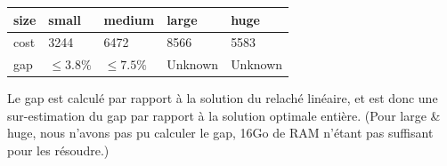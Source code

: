 \documentclass[a4paper,12pt]{article}
\begin{document}
\begin{table}[h]
    \centering

    \begin{tabular}{lllll}
    size & small         & medium       & large   & huge    \\ \hline
    cost & 3244          & 6472         & 8566    & 5583    \\
    gap  & $\leq 3.8 \%$ & $\leq 7.5\%$ & Unknown & Unknown \\ \hline
    \end{tabular}

\end{table}

Le gap est calculé par rapport à la solution du relaché linéaire, et est donc une sur-estimation du gap par rapport à la solution optimale entière.
(Pour large \& huge, nous n'avons pas pu calculer le gap, 16Go de RAM n'étant pas suffisant pour les résoudre.)
\end{document}
